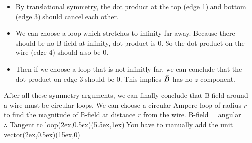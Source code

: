 \documentclass[class=article, crop=false, 12pt]{standalone}
\begin{document}
\begin{example}
\begin{enumerate}
        \begin{itemize}
            \item By translational symmetry, 
            the dot product at the top (edge 1) and bottom (edge 3) should cancel each other. 

            \item We can choose a loop which stretches to infinity far away.
            Because there should be no B-field at infinity, dot product is $0$.
            So the dot product on the wire (edge 4) should also be $0$.

            \item Then if we choose a loop that is not infinitly far,
            we can conclude that the dot product on edge 3 should be $0$.
            This implies $\va*{B}$ has no $z$ component.
        \end{itemize}
    \end{enumerate}

    After all these symmetry arguments,
    we can finally conclude that B-field around a wire must be circular loops. 
    We can choose a circular Ampere loop of radius $r$ to find the magnitude of B-field
    at distance $r$ from the wire.
    {\scriptsize B-field = angular \\[-1ex]\scriptsize $\therefore$ Tangent to loop}{(2ex,0.5ex)}{(5.5ex,1ex)}
    {\scriptsize You have to manually add the unit vector}{(2ex,0.5ex)}{(15ex,0)}


\end{example}
\end{document}
